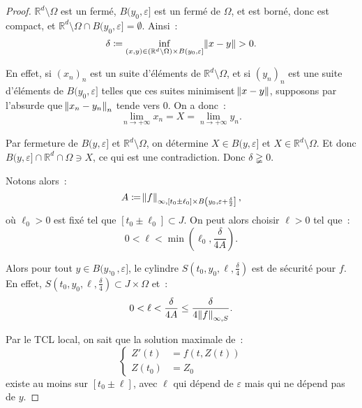 \documentclass{report}
\theoremstyle{definition}
\theoremstyle{remark}
\numberwithin{equation}{section}
\newcommand{\R}{\mathbb R}
\newcommand{\pinfty}{{+\infty}}
\begin{document}
			\begin{proof} $\R^d \setminus \Omega$ est un fermé, $B(y_0, \varepsilon]$ est un fermé de $\Omega$, et est borné, donc est compact, et
			$\R^d \setminus \Omega \cap B(y_0, \varepsilon] = \emptyset$. Ainsi~:
			\begin{equation}
				\delta \coloneqq \inf_{(x, y) \in (\R^d \setminus \Omega) \times B(y_0, \varepsilon]}\norm {x-y} > 0.
			\end{equation}

			En effet, si $(x_n)_n$ est un suite d'éléments de $\R^d \setminus \Omega$, et si $(y_n)_n$ est une suite d'éléments de $B(y_0, \varepsilon]$ telles
			que ces suites minimisent $\norm {x-y}$, supposons par l'absurde que $\norm {x_n-y_n}_n$ tende vers 0. On a donc~:
			\begin{equation}
				\lim_{n \to \pinfty}x_n = X = \lim_{n \to \pinfty}y_n.
			\end{equation}

			Par fermeture de $B(y, \varepsilon]$ et $\R^d \setminus \Omega$, on détermine $X \in B(y, \varepsilon]$ et $X \in \R^d \setminus \Omega$.
			Et donc $B(y, \varepsilon] \cap \R^d \cap \Omega \ni X$, ce qui est une contradiction. Donc $\delta \gneqq 0$.

			Notons alors~:
			\begin{equation}
				A \coloneqq \norm f_{\infty, [t_0 \pm \ell_0] \times B\left(y_0, \varepsilon+\frac \delta2\right]},
			\end{equation}
			où $\ell_0 > 0$ est fixé tel que $[t_0 \pm \ell_0] \subset J$. On peut alors choisir $\ell > 0$ tel que~:
			\begin{equation}
				0 < \ell < \min\left(\ell_0, \frac \delta{4A}\right).
			\end{equation}

			Alors pour tout $y \in B(y,_0, \varepsilon]$, le cylindre $S(t_0, y_0, \ell, \frac \delta4)$ est de sécurité pour $f$. En effet,
			$S(t_0, y_0, \ell, \frac \delta 4) \subset J \times \Omega$ et~:
			\begin{equation}
				0 < \ell < \frac \delta{4A} \leq \frac \delta{4\norm f_{\infty, S}}.
			\end{equation}

			Par le TCL local, on sait que la solution maximale de~:
			\begin{equation}
				\begin{cases}
				Z'(t) &= f(t, Z(t)) \\
				Z(t_0) &= Z_0
			\end{cases}
			\end{equation}
			existe au moins sur $[t_0 \pm \ell]$, avec $\ell$ qui dépend de $\varepsilon$ mais qui ne dépend pas de $y$.
			\end{proof}
\end{document}
